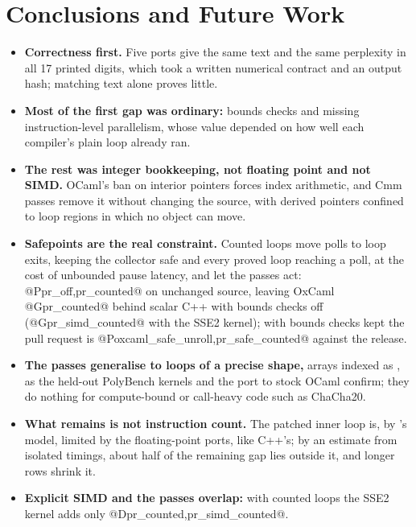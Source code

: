 \section{Conclusions and Future Work}
\label{sec:conclusion}

\begin{itemize}
  \item \textbf{Correctness first.} Five ports give the same text and the same
        perplexity in all 17 printed digits, which took a written numerical
        contract and an output hash; matching text alone proves little.
  \item \textbf{Most of the first gap was ordinary:} bounds checks and missing
        instruction-level parallelism, whose value depended on how well each
        compiler's plain loop already ran.
  \item \textbf{The rest was integer bookkeeping, not floating point and not
        SIMD.} OCaml's ban on interior pointers forces index arithmetic, and
        Cmm passes remove it without changing the source, with derived
        pointers confined to loop regions in which no object can move.
  \item \textbf{Safepoints are the real constraint.} Counted loops move polls
        to loop exits, keeping the collector safe and every proved loop
        reaching a poll, at the cost of unbounded pause latency, and
        let the passes act: @P{pr_off,pr_counted}@ on unchanged source,
        leaving OxCaml @G{pr_counted}@ behind scalar C++ with bounds checks
        off (@G{pr_simd_counted}@ with the SSE2 kernel); with bounds checks
        kept the pull request is @P{oxcaml_safe_unroll,pr_safe_counted}@
        against the release.
  \item \textbf{The passes generalise to loops of a precise shape,} arrays
        indexed as , as the held-out PolyBench
        kernels and the port to stock OCaml confirm; they do nothing for
        compute-bound or call-heavy code such as ChaCha20.
  \item \textbf{What remains is not instruction count.} The patched inner loop
        is, by 's model, limited by the floating-point ports,
        like C++'s; by an estimate from isolated timings, about half of the
        remaining gap lies outside it, and longer rows shrink it.
  \item \textbf{Explicit SIMD and the passes overlap:} with counted loops the
        SSE2 kernel adds only @D{pr_counted,pr_simd_counted}@.
\end{itemize}


